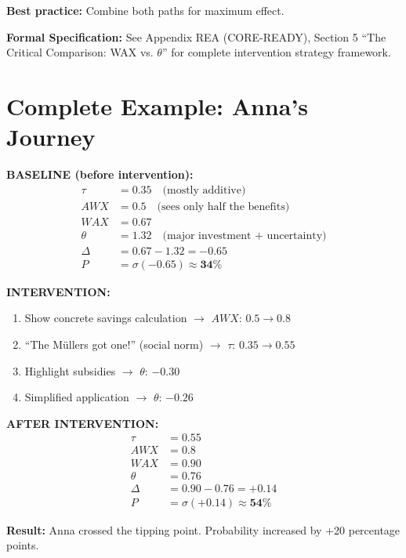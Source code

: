 \textbf{Best practice:} Combine both paths for maximum effect.

\begin{cross-reference}
\textbf{Formal Specification:} See Appendix REA (CORE-READY), Section 5 ``The Critical
Comparison: WAX vs. $\theta$'' for complete intervention strategy framework.
\end{cross-reference}



\section{Complete Example: Anna's Journey}
\label{sec:12-anna}


\begin{example}

\textbf{BASELINE (before intervention):}
\begin{align}
\tau &= 0.35 \quad \text{(mostly additive)}\\
AWX &= 0.5 \quad \text{(sees only half the benefits)}\\
WAX &= 0.67\\
\theta &= 1.32 \quad \text{(major investment + uncertainty)}\\
\Delta &= 0.67 - 1.32 = \mathbf{-0.65}\\
P &= \sigma(-0.65) \approx \mathbf{34\%}
\end{align}

\textbf{INTERVENTION:}
\begin{enumerate}
\item Show concrete savings calculation $\rightarrow$ $AWX$: $0.5 \to 0.8$
\item ``The Müllers got one!'' (social norm) $\rightarrow$ $\tau$: $0.35 \to 0.55$
\item Highlight subsidies $\rightarrow$ $\theta$: $-0.30$
\item Simplified application $\rightarrow$ $\theta$: $-0.26$
\end{enumerate}

\textbf{AFTER INTERVENTION:}
\begin{align}
\tau &= 0.55\\
AWX &= 0.8\\
WAX &= 0.90\\
\theta &= 0.76\\
\Delta &= 0.90 - 0.76 = \mathbf{+0.14}\\
P &= \sigma(+0.14) \approx \mathbf{54\%}
\end{align}

\textbf{Result:} Anna crossed the tipping point. Probability increased by +20 percentage points.
\end{example}

